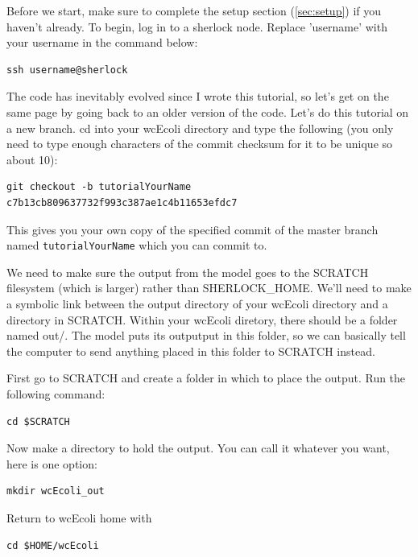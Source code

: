 \documentclass[12pt]{article}
\begin{document}
Before we start, make sure to complete the setup section (\ref{sec:setup}) if you haven't already. To begin, log in to a sherlock node. Replace 'username' with your username in the command below:

\lstset{language=bash}
\begin{lstlisting}
ssh username@sherlock
\end{lstlisting}

The code has inevitably evolved since I wrote this tutorial, so let’s get on the same page by going back to an older version of the code. Let’s do this tutorial on a new branch. cd into your wcEcoli directory and type the following (you only need to type enough characters of the commit checksum for it to be unique so about 10):

\lstset{language=bash}
\begin{lstlisting}
git checkout -b tutorialYourName c7b13cb809637732f993c387ae1c4b11653efdc7
\end{lstlisting}

This gives you your own copy of the specified commit of the master branch named \texttt{tutorialYourName} which you can commit to.

We need to make sure the output from the model goes to the SCRATCH filesystem (which is larger) rather than SHERLOCK\_HOME. We'll need to make a symbolic link between the output directory of your wcEcoli directory and a directory in SCRATCH. Within your wcEcoli diretory, there should be a folder named out/. The model puts its outputput in this folder, so we can basically tell the computer to send anything placed in this folder to SCRATCH instead.

First go to SCRATCH and create a folder in which to place the output. Run the following command:

\lstset{language=bash}
\begin{lstlisting}
cd $SCRATCH
\end{lstlisting}

Now make a directory to hold the output. You can call it whatever you want, here is one option:

\lstset{language=bash}
\begin{lstlisting}
mkdir wcEcoli_out
\end{lstlisting}

Return to wcEcoli home with

\lstset{language=bash}
\begin{lstlisting}
cd $HOME/wcEcoli
\end{lstlisting}
\end{document}
